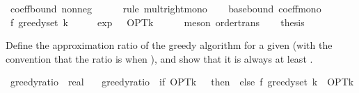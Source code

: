 \begin{isabellebody}
\ coeff{\isacharunderscore}{\kern0pt}bound\ nonneg\isanewline
\ \ \ \ \isamarkupfalse%
\ {\isacharparenleft}{\kern0pt}rule\ mult{\isacharunderscore}{\kern0pt}right{\isacharunderscore}{\kern0pt}mono{\isacharparenright}{\kern0pt}\isanewline
\isanewline
\ \ \isamarkupfalse%
\ base{\isacharunderscore}{\kern0pt}bound\ coeff{\isacharunderscore}{\kern0pt}mono\isanewline
\ \ \isamarkupfalse%
\ {\isachardoublequoteopen}f\ {\isacharparenleft}{\kern0pt}greedy{\isacharunderscore}{\kern0pt}set\ k{\isacharparenright}{\kern0pt}\ {\isasymge}\ {\isacharparenleft}{\kern0pt}{}\ {\isacharminus}{\kern0pt}\ {}\ {\isacharslash}{\kern0pt}\ exp\ {}{\isacharparenright}{\kern0pt}\ {\isacharasterisk}{\kern0pt}\ OPT{\isacharunderscore}{\kern0pt}k{\isachardoublequoteclose}\isanewline
\ \ \ \ \isamarkupfalse%
\ {\isacharparenleft}{\kern0pt}meson\ order{\isacharunderscore}{\kern0pt}trans{\isacharparenright}{\kern0pt}\isanewline
\ \ \isamarkupfalse%
\ {\isacharquery}{\kern0pt}thesis\ \isakeywordONE{{\isachardot}{\kern0pt}}\isamarkupfalse%
\isanewline
{}\isamarkupfalse%
%
\endisatagproof
{\isafoldproof}%
%
\isadelimproof
%
\endisadelimproof
%
\isadelimdocument
%
\endisadelimdocument
%
\isatagdocument
%
\isamarkuptrue%
%
\endisatagdocument
{\isafolddocument}%
%
\isadelimdocument
%
\endisadelimdocument
%
\begin{isamarkuptext}%
Define the approximation ratio of the greedy algorithm for a given 
  (with the convention that the ratio is  when ), and show
  that it is always at least .%
\end{isamarkuptext}\isamarkuptrue%
\isamarkupfalse%
\ greedy{\isacharunderscore}{\kern0pt}ratio\ {\isacharcolon}{\kern0pt}{\isacharcolon}{\kern0pt}\ real\ \isanewline
\ \ {\isachardoublequoteopen}greedy{\isacharunderscore}{\kern0pt}ratio\ {\isacharequal}{\kern0pt}\ {\isacharparenleft}{\kern0pt}if\ OPT{\isacharunderscore}{\kern0pt}k\ {\isacharequal}{\kern0pt}\ {}\ then\ {}\ else\ f\ {\isacharparenleft}{\kern0pt}greedy{\isacharunderscore}{\kern0pt}set\ k{\isacharparenright}{\kern0pt}\ {\isacharslash}{\kern0pt}\ OPT{\isacharunderscore}{\kern0pt}k{\isacharparenright}{\kern0pt}{\isachardoublequoteclose}\isanewline

\end{isabellebody}
